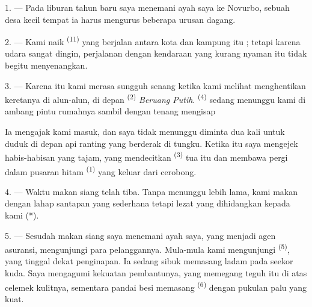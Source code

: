 \VUsaut{4.0mm}
\VUsaut{3.0mm}
\VUfilet{16mm}
\VUsaut{5.6mm}
\VUsaut{3.0mm}

\VUsaut{3.0mm}

\VUsaut{4.0mm}

1. --- Pada liburan tahun baru saya menemani ayah saya ke Novurbo,
sebuah desa kecil tempat ia harus mengurus beberapa urusan dagang.

2. --- Kami naik  \textsuperscript{(11)} yang berjalan
antara kota dan kampung itu ; tetapi karena udara sangat dingin,
perjalanan dengan kendaraan yang kurang nyaman itu tidak begitu
menyenangkan.

3. --- Karena itu kami merasa sungguh senang ketika kami melihat
 menghentikan keretanya di alun-alun, di depan
 \textsuperscript{(2)} \textit{Beruang Putih}.
 \textsuperscript{(4)} sedang menunggu kami
di ambang pintu rumahnya sambil dengan tenang mengisap

Ia mengajak kami masuk, dan saya tidak menunggu diminta dua kali untuk
duduk di depan api ranting yang berderak di tungku. Ketika itu saya
mengejek habis-habisan  yang tajam, yang
mendecitkan  \textsuperscript{(3)} tua itu dan
membawa pergi dalam pusaran hitam 
\textsuperscript{(1)} yang keluar dari cerobong.

4. --- Waktu makan siang telah tiba. Tanpa menunggu lebih lama, kami
makan dengan lahap santapan yang sederhana tetapi lezat yang
dihidangkan kepada kami (*).

\VUsaut{3.0mm}

5. --- Sesudah makan siang saya menemani ayah saya, yang menjadi agen
asuransi, mengunjungi para pelanggannya. Mula-mula kami mengunjungi
 \textsuperscript{(5)}, yang tinggal dekat
penginapan. Ia sedang sibuk memasang ladam pada seekor kuda. Saya
mengagumi kekuatan pembantunya, yang memegang teguh 
itu di atas celemek kulitnya, sementara pandai besi memasang
 \textsuperscript{(6)} dengan pukulan palu yang kuat.

